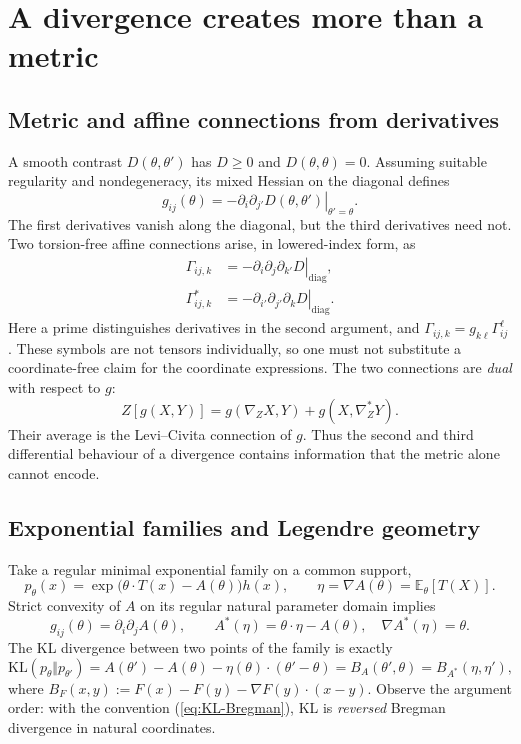 \documentclass[11pt]{article}
\theoremstyle{definition}\newtheorem{definition}[theorem]{Definition}\newtheorem{exercise}{Problem}[section]
\newcommand{\EE}{\mathbb E}\newcommand{\RR}{\mathbb R}
\newcommand{\KL}{\mathrm{KL}}
\begin{document}
\section{A divergence creates more than a metric}\label{sec:divergence}

\subsection{Metric and affine connections from derivatives}

A smooth contrast $D(\theta,\theta')$ has $D\ge0$ and $D(\theta,\theta)=0$. Assuming suitable regularity and nondegeneracy, its mixed Hessian on the diagonal defines
\begin{equation}\label{eq:eguchi-g}
 g_{ij}(\theta)=-\left.\partial_i\partial_{j'}D(\theta,\theta')\right|_{\theta'=\theta}.
\end{equation}
The first derivatives vanish along the diagonal, but the third derivatives need not. Two torsion-free affine connections arise, in lowered-index form, as
\begin{align}\label{eq:eguchi-gammas}
\Gamma_{ij,k}&=-\left.\partial_i\partial_j\partial_{k'}D\right|_{\mathrm{diag}},\\
\Gamma^*_{ij,k}&=-\left.\partial_{i'}\partial_{j'}\partial_kD\right|_{\mathrm{diag}}.
\end{align}
Here a prime distinguishes derivatives in the second argument, and $\Gamma_{ij,k}=g_{k\ell}\Gamma^\ell_{ij}$. These symbols are not tensors individually, so one must not substitute a coordinate-free claim for the coordinate expressions. The two connections are \emph{dual} with respect to $g$:
\[
 Z[g(X,Y)]=g(\nabla_ZX,Y)+g(X,\nabla_Z^*Y).
\]
Their average is the Levi--Civita connection of $g$. Thus the second and third differential behaviour of a divergence contains information that the metric alone cannot encode.

\subsection{Exponential families and Legendre geometry}

Take a regular minimal exponential family on a common support,
\[
 p_\theta(x)=\exp\!\bigl(\theta\cdot T(x)-A(\theta)\bigr)h(x),
 \qquad \eta=\nabla A(\theta)=\EE_\theta[T(X)].
\]
Strict convexity of $A$ on its regular natural parameter domain implies
\[
 g_{ij}(\theta)=\partial_i\partial_j A(\theta),\qquad
 A^*(\eta)=\theta\cdot\eta-A(\theta),\quad \nabla A^*(\eta)=\theta.
\]
The KL divergence between two points of the family is exactly
\begin{equation}\label{eq:KL-Bregman}
 \KL(p_\theta\Vert p_{\theta'})
 =A(\theta')-A(\theta)-\eta(\theta)\cdot(\theta'-\theta)
 =B_A(\theta',\theta)=B_{A^*}(\eta,\eta'),
\end{equation}
where $B_F(x,y):=F(x)-F(y)-\nabla F(y)\cdot(x-y)$. Observe the argument order: with the convention (\ref{eq:KL-Bregman}), KL is \emph{reversed} Bregman divergence in natural coordinates.
\end{document}
